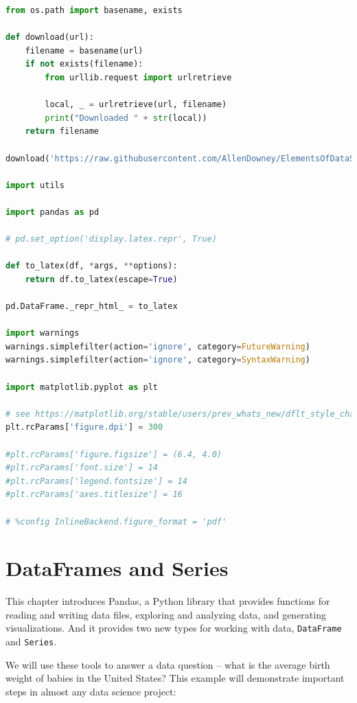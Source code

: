 \documentclass[
]{book}
\author{}
\date{}
\newcommand{\passthrough}[1]{#1}
\begin{document}
\frontmatter

\mainmatter
\begin{lstlisting}[language=Python]
from os.path import basename, exists

def download(url):
    filename = basename(url)
    if not exists(filename):
        from urllib.request import urlretrieve

        local, _ = urlretrieve(url, filename)
        print("Downloaded " + str(local))
    return filename

download('https://raw.githubusercontent.com/AllenDowney/ElementsOfDataScience/v1/utils.py')

import utils

import pandas as pd

# pd.set_option('display.latex.repr', True)

def to_latex(df, *args, **options):
    return df.to_latex(escape=True)

pd.DataFrame._repr_html_ = to_latex

import warnings
warnings.simplefilter(action='ignore', category=FutureWarning)
warnings.simplefilter(action='ignore', category=SyntaxWarning)

import matplotlib.pyplot as plt

# see https://matplotlib.org/stable/users/prev_whats_new/dflt_style_changes.html#figure-size-font-size-and-screen-dpi
plt.rcParams['figure.dpi'] = 300

#plt.rcParams['figure.figsize'] = (6.4, 4.0)
#plt.rcParams['font.size'] = 14
#plt.rcParams['legend.fontsize'] = 14
#plt.rcParams['axes.titlesize'] = 16

# %config InlineBackend.figure_format = 'pdf'
\end{lstlisting}

\chapter{DataFrames and Series}\label{dataframes-and-series}

This chapter introduces Pandas, a Python library that provides functions
for reading and writing data files, exploring and analyzing data, and
generating visualizations. And it provides two new types for working
with data, \passthrough{\lstinline!DataFrame!} and
\passthrough{\lstinline!Series!}.

We will use these tools to answer a data question -- what is the average
birth weight of babies in the United States? This example will
demonstrate important steps in almost any data science project:
\end{document}
